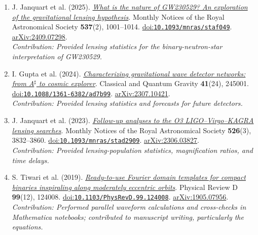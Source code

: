 \documentclass[11pt]{article}
\begin{document}
\begin{enumerate}
\item J. Janquart et al. (2025). \href{https://doi.org/10.1093/mnras/staf049}{\textit{What is the nature of GW230529? An exploration of the gravitational lensing hypothesis}}. Monthly Notices of the Royal Astronomical Society \textbf{537}(2), 1001--1014. \href{https://doi.org/10.1093/mnras/staf049}{doi:\nolinkurl{10.1093/mnras/staf049}}. \href{https://arxiv.org/abs/2409.07298}{arXiv:2409.07298}.\\\emph{Contribution: Provided lensing statistics for the binary-neutron-star interpretation of GW230529.}
\item I. Gupta et al. (2024). \href{https://doi.org/10.1088/1361-6382/ad7b99}{\textit{Characterizing gravitational wave detector networks: from A$^\sharp$ to cosmic explorer}}. Classical and Quantum Gravity \textbf{41}(24), 245001. \href{https://doi.org/10.1088/1361-6382/ad7b99}{doi:\nolinkurl{10.1088/1361-6382/ad7b99}}. \href{https://arxiv.org/abs/2307.10421}{arXiv:2307.10421}.\\\emph{Contribution: Provided lensing statistics and forecasts for future detectors.}
\item J. Janquart et al. (2023). \href{https://doi.org/10.1093/mnras/stad2909}{\textit{Follow-up analyses to the O3 LIGO--Virgo--KAGRA lensing searches}}. Monthly Notices of the Royal Astronomical Society \textbf{526}(3), 3832--3860. \href{https://doi.org/10.1093/mnras/stad2909}{doi:\nolinkurl{10.1093/mnras/stad2909}}. \href{https://arxiv.org/abs/2306.03827}{arXiv:2306.03827}.\\\emph{Contribution: Provided lensing-population statistics, magnification ratios, and time delays.}
\item S. Tiwari et al. (2019). \href{https://doi.org/10.1103/PhysRevD.99.124008}{\textit{Ready-to-use Fourier domain templates for compact binaries inspiraling along moderately eccentric orbits}}. Physical Review D \textbf{99}(12), 124008. \href{https://doi.org/10.1103/PhysRevD.99.124008}{doi:\nolinkurl{10.1103/PhysRevD.99.124008}}. \href{https://arxiv.org/abs/1905.07956}{arXiv:1905.07956}.\\\emph{Contribution: Performed parallel waveform calculations and cross-checks in Mathematica notebooks; contributed to manuscript writing, particularly the equations.}
\end{enumerate}
\end{document}
